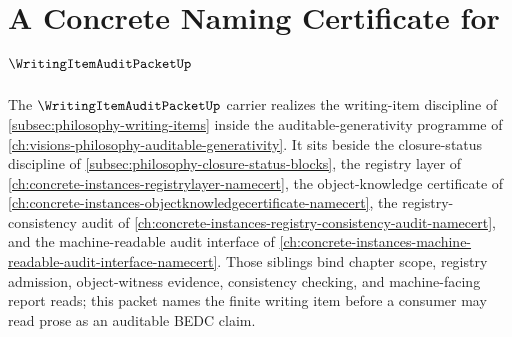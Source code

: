 \chapter{A Concrete Naming Certificate for $\WritingItemAuditPacketUp$}
\label{ch:concrete-instances-writing-item-audit-packet-namecert}

The $\WritingItemAuditPacketUp$ carrier realizes the writing-item discipline of \autoref{subsec:philosophy-writing-items} inside the auditable-generativity programme of \autoref{ch:visions-philosophy-auditable-generativity}. It sits beside the closure-status discipline of \autoref{subsec:philosophy-closure-status-blocks}, the registry layer of \autoref{ch:concrete-instances-registrylayer-namecert}, the object-knowledge certificate of \autoref{ch:concrete-instances-objectknowledgecertificate-namecert}, the registry-consistency audit of \autoref{ch:concrete-instances-registry-consistency-audit-namecert}, and the machine-readable audit interface of \autoref{ch:concrete-instances-machine-readable-audit-interface-namecert}. Those siblings bind chapter scope, registry admission, object-witness evidence, consistency checking, and machine-facing report reads; this packet names the finite writing item before a consumer may read prose as an auditable BEDC claim.

